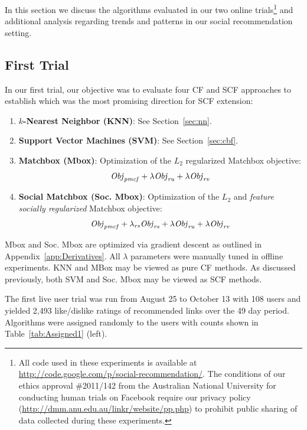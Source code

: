 In this section we discuss the algorithms evaluated in our two online
trials\footnote{All code used in these experiments is available at
\url{http://code.google.com/p/social-recommendation/}.  The conditions
of our ethics approval \#2011/142 from the Australian National
University for conducting human trials on Facebook require our
privacy policy
(\url{http://dmm.anu.edu.au/linkr/website/pp.php}) to
prohibit public sharing of data collected during these experiments.}
and additional analysis regarding trends and patterns in our social
recommendation setting.

\subsection{First Trial}

In our first trial, our objective was to evaluate four CF and SCF
approaches to establish which was the most promising direction for
SCF extension:
\begin{enumerate}
\item {\bf $k$-Nearest Neighbor (KNN)}: See Section~\ref{sec:nn}.
\item {\bf Support Vector Machines (SVM)}: See Section~\ref{sec:cbf}.
\item {\bf Matchbox (Mbox)}: Optimization of the $L_2$ regularized
Matchbox objective:
$$\mathit{Obj}_{\mathit{pmcf}} + \lambda \mathit{Obj}_{\mathit{ru}} + \lambda \mathit{Obj}_{\mathit{rv}}$$
\item {\bf Social Matchbox (Soc. Mbox)}: Optimization of the 
$L_2$ and \emph{feature socially regularized} Matchbox objective:
$$\mathit{Obj}_{\mathit{pmcf}} + \lambda_{\mathit{rs}} \mathit{Obj}_{\mathit{rs}} + \lambda \mathit{Obj}_{\mathit{ru}} + \lambda \mathit{Obj}_{\mathit{rv}}$$
\end{enumerate}
Mbox and Soc. Mbox are optimized via gradient descent as outlined
in Appendix~\ref{app:Derivatives}.  All $\lambda$ parameters were manually
tuned in offline experiments.
KNN and MBox may be viewed as pure CF methods.  As discussed previously,
both SVM and Soc. Mbox may be viewed as SCF methods.  

The first live user trial was run from August 25 to October 13
with 108 users and yielded 2,493 like/dislike ratings of recommended
links over the 49 day period.  Algorithms were assigned randomly to the
users with counts shown in Table~\ref{tab:Assigned1} (left).

